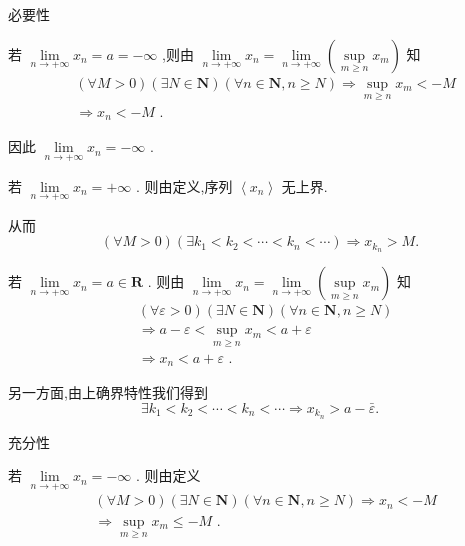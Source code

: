 必要性

若 $\mathop{\lim }\limits_{{n \rightarrow   + \infty }}{x}_{n} = a =  - \infty$ ,则由 $\mathop{\lim }\limits_{{n \rightarrow   + \infty }}{x}_{n} = \mathop{\lim }\limits_{{n \rightarrow   + \infty }}\left( {\mathop{\sup }\limits_{{m \geq  n}}{x}_{m}}\right)$ 知
\begin{align*}
	&\left( {\forall M > 0}\right) \left( {\exists N \in  \mathbf{N}}\right) \left( {\forall n \in  \mathbf{N},n \geq  N}\right)  \Rightarrow  \mathop{\sup }\limits_{{m \geq  n}}{x}_{m} <  - M\\
	&\Rightarrow  {x}_{n} <  - M\text{ . }
\end{align*}

因此 $\mathop{\lim }\limits_{{n \rightarrow   + \infty }}{x}_{n} =  - \infty$ .

若 $\mathop{\lim }\limits_{{n \rightarrow   + \infty }}{x}_{n} =  + \infty$ . 则由定义,序列 $\left\langle  {x}_{n}\right\rangle$ 无上界.

从而
$$\left( {\forall M > 0}\right) \left( {\exists {k}_{1} < {k}_{2} < \cdots  < {k}_{n} < \cdots }\right)  \Rightarrow  {x}_{{k}_{n}} > M.$$

若 $\mathop{\lim }\limits_{{n \rightarrow   + \infty }}{x}_{n} = a \in  \mathbf{R}$ . 则由 $\mathop{\lim }\limits_{{n \rightarrow   + \infty }}{x}_{n} = \mathop{\lim }\limits_{{n \rightarrow   + \infty }}\left( {\mathop{\sup }\limits_{{m \geq  n}}{x}_{m}}\right)$ 知
\begin{align*}
	&\left( {\forall \varepsilon  > 0}\right) \left( {\exists N \in  \mathbf{N}}\right) \left( {\forall n \in  \mathbf{N},n \geq  N}\right)\\
	&\Rightarrow  a - \varepsilon  < \mathop{\sup }\limits_{{m \geq  n}}{x}_{m} < a + \varepsilon\\
	&\Rightarrow  {x}_{n} < a + \varepsilon \text{ . }
\end{align*}

另一方面,由上确界特性我们得到
$$\exists {k}_{1} < {k}_{2} < \cdots  < {k}_{n} < \cdots  \Rightarrow  {x}_{{k}_{n}} > a - \bar{\varepsilon }.$$

充分性

若 $\mathop{\lim }\limits_{{n \rightarrow   + \infty }}{x}_{n} =  - \infty$ . 则由定义
\begin{align*}
	&\left( {\forall M > 0}\right) \left( {\exists N \in  \mathbf{N}}\right) \left( {\forall n \in  \mathbf{N},n \geq  N}\right)  \Rightarrow  {x}_{n} <  - M\\
	&\Rightarrow  \mathop{\sup }\limits_{{m \geq  n}}{x}_{m} \leq   - M\text{ . }
\end{align*}

